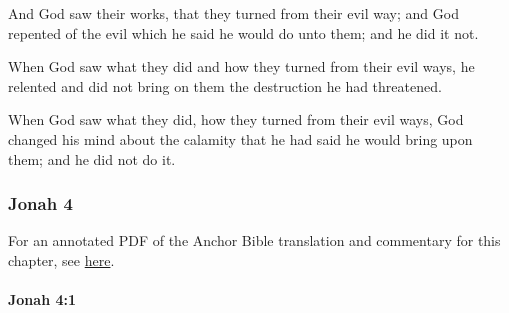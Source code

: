 			\begin{versebox}
					\item[BHS] 
					\item[LXX] 
					\item[ASV] And God saw their works, that they turned from their evil way; and God repented of the evil which he said he would do unto them; and he did it not.
					\item[NIV] When God saw what they did and how they turned from their evil ways, he relented and did not bring on them the destruction he had threatened.
					\item[NRSV] When God saw what they did, how they turned from their evil ways, God changed his mind about the calamity that he had said he would bring upon them; and he did not do it.
			\end{versebox}
			
	\subsubsection{Jonah 4} %
		\label{JONAH-4}
		
		For an annotated PDF of the Anchor Bible translation and commentary for this chapter, see \href{https://drive.google.com/file/d/15MBSQEAHSI2jNEDlT4IUTfcpWPSrV813/view?usp=share_link}{here}.

		\paragraph{Jonah 4:1} %
			\label{JONAH-4-1}

